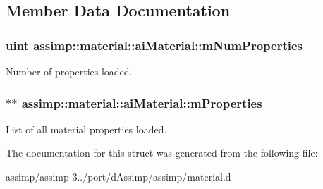 \subsection{Member Data Documentation}
\hypertarget{structassimp_1_1material_1_1ai_material_a158d737c0c104c6523e75096c184ef7b}{
\subsubsection[{m\+Num\+Properties}]{\setlength{\rightskip}{0pt plus 5cm}uint assimp\+::material\+::ai\+Material\+::m\+Num\+Properties}}\label{structassimp_1_1material_1_1ai_material_a158d737c0c104c6523e75096c184ef7b}
Number of properties loaded. \hypertarget{structassimp_1_1material_1_1ai_material_a300cd9502dcd87f1063e4a758bdf964e}{
\subsubsection[{m\+Properties}]{$\ast$$\ast$ assimp\+::material\+::ai\+Material\+::m\+Properties}}\label{structassimp_1_1material_1_1ai_material_a300cd9502dcd87f1063e4a758bdf964e}
List of all material properties loaded. 

The documentation for this struct was generated from the following file\+:\begin{DoxyCompactItemize}
\item 
assimp/assimp-\/3../port/d\+Assimp/assimp/material.\+d\end{DoxyCompactItemize}
